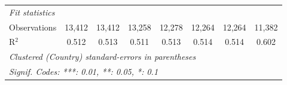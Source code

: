 \begin{tabular}{lccccccc}
   \midrule \emph{Fit statistics}\\
   Observations                                                        & 13,412         & 13,412        & 13,258       & 12,278       & 12,264        & 12,264        & 11,382\\  
   R$^2$                                                               & 0.512          & 0.513         & 0.511        & 0.513        & 0.514         & 0.514         & 0.602\\  
   \midrule
   \multicolumn{8}{l}{\emph{Clustered (Country) standard-errors in parentheses}}\\
   \multicolumn{8}{l}{\emph{Signif. Codes: ***: 0.01, **: 0.05, *: 0.1}}\\
\end{tabular}
\par\endgroup


